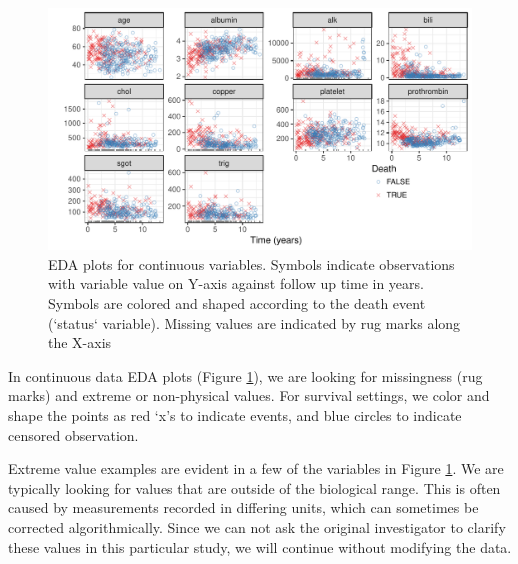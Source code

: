 \documentclass[article]{jss}
\begin{document}
\begin{Schunk}
\begin{figure}[!htb]

{\centering \includegraphics{fig-rfs/rfs-continuousEDA-1} 

}

\caption[EDA plots for continuous variables]{EDA plots for continuous variables. Symbols indicate observations with variable value on Y-axis against follow up time in years. Symbols are colored and shaped according to the death event  (`status` variable). Missing values are indicated by rug marks along the X-axis}\label{fig:continuousEDA}
\end{figure}
\end{Schunk}

In continuous data EDA plots (Figure \ref{fig:continuousEDA}), we are
looking for missingness (rug marks) and extreme or non-physical values.
For survival settings, we color and shape the points as red `x's to
indicate events, and blue circles to indicate censored observation.

Extreme value examples are evident in a few of the variables in Figure
\ref{fig:continuousEDA}. We are typically looking for values that are
outside of the biological range. This is often caused by measurements
recorded in differing units, which can sometimes be corrected
algorithmically. Since we can not ask the original investigator to
clarify these values in this particular study, we will continue without
modifying the data.
\end{document}
